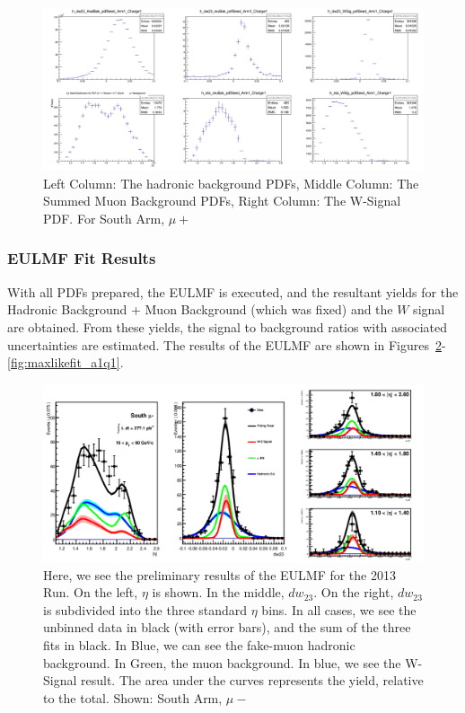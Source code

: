 \begin{figure}
  \centering
  \includegraphics[width=\linewidth]{././figures/c_dw23_Eta_PDF_Arm1_Charge1.png}
  \caption{
    Left Column: The hadronic background PDFs, Middle Column: The Summed Muon
    Background PDFs, Right Column: The W-Signal PDF. For South Arm, $\mu+$
  }
  \label{fig:c_dw23_Eta_PDF_Arm1_Charge1}
\end{figure}

\clearpage
\subsubsection{EULMF Fit Results}

With all PDFs prepared, the EULMF is executed, and the resultant yields for the
Hadronic Background + Muon Background (which was fixed) and the $W$ signal are
obtained. From these yields, the signal to background ratios with associated
uncertainties are estimated. The results of the EULMF are shown in
Figures~\ref{fig:maxlikefit_a0q0}-\ref{fig:maxlikefit_a1q1}.

\begin{figure}[ht]
  \centering
  \includegraphics[width=\linewidth]{./figures/prelim_full_maxlikefit_a0q0.jpg}
  \caption{
    Here, we see the preliminary results of the EULMF for the 2013 Run. On the
    left, $\eta$ is shown. In the middle, $dw_{23}$. On the right, $dw_{23}$ is
    subdivided into the three standard $\eta$ bins. In all cases, we see the
    unbinned data in black (with error bars), and the sum of the three fits in
    black. In Blue, we can see the fake-muon hadronic background. In Green, the
    muon background. In blue, we see the W-Signal result. The area under the
    curves represents the yield, relative to the total. Shown: South Arm,
    $\mu-$~\cite{Seidl2014a}
  }
  \label{fig:maxlikefit_a0q0}
\end{figure}

